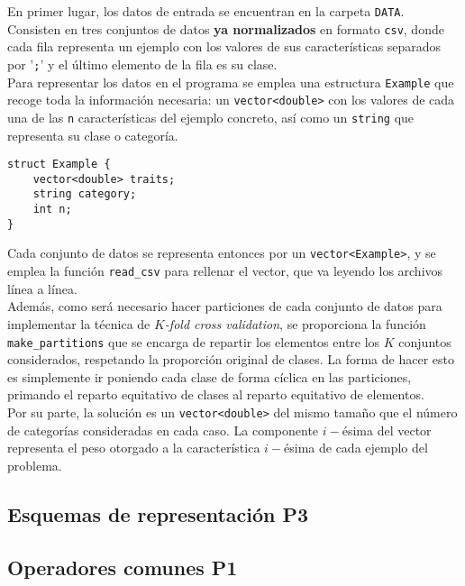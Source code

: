 \documentclass[12pt]{article}
\begin{document}
En primer lugar, los datos de entrada se encuentran en la carpeta \verb|DATA|. Consisten en tres conjuntos de datos \textbf{ya normalizados} en formato \verb|csv|, donde cada fila representa un ejemplo con los valores de sus características separados por '\verb|;|' y el último elemento de la fila es su clase.\\

Para representar los datos en el programa se emplea una estructura \verb|Example| que recoge toda la información necesaria: un \verb|vector<double>| con los valores de cada una de las \verb|n| características del ejemplo concreto, así como un \verb|string| que representa su clase o categoría.

\begin{verbatim}
struct Example {
    vector<double> traits;
    string category;
    int n;
}
\end{verbatim}

Cada conjunto de datos se representa entonces por un \verb|vector<Example>|, y se emplea la función \verb|read_csv| para rellenar el vector, que va leyendo los archivos línea a línea.\\

Además, como será necesario hacer particiones de cada conjunto de datos para implementar la técnica de \textit{$K$-fold cross validation}, se proporciona la función \verb|make_partitions| que se encarga de repartir los elementos entre los $K$ conjuntos considerados, respetando la proporción original de clases. La forma de hacer esto es simplemente ir poniendo cada clase de forma cíclica en las particiones, primando el reparto equitativo de clases al reparto equitativo de elementos.\\

Por su parte, la solución es un \verb|vector<double>| del mismo tamaño que el número de categorías consideradas en cada caso. La componente $i-$ésima del vector representa el peso otorgado a la característica $i-$ésima de cada ejemplo del problema.

\subsection*{Esquemas de representación P3}
\label{representacion}

\subsection*{{\color{red}Operadores comunes P1}}
\end{document}
